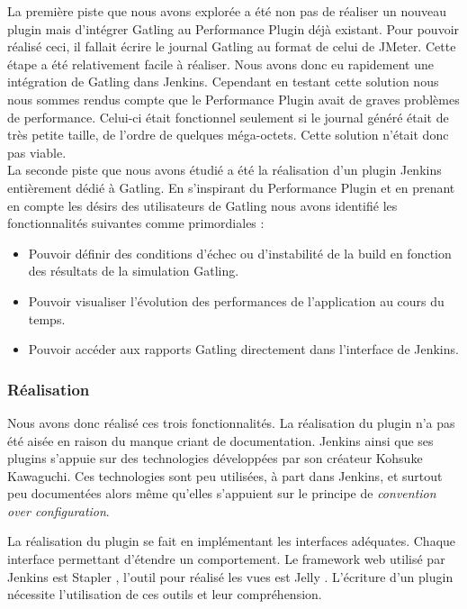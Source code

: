 La première piste que nous avons explorée a été non pas de réaliser un nouveau plugin mais d'intégrer Gatling au Performance Plugin déjà existant. Pour pouvoir réalisé ceci, il fallait écrire le journal Gatling au format de celui de JMeter. Cette étape a été relativement facile à réaliser. Nous avons donc eu rapidement une intégration de Gatling dans Jenkins. Cependant en testant cette solution nous nous sommes rendus compte que le Performance Plugin avait de graves problèmes de performance. Celui-ci était fonctionnel seulement si le journal généré était de très petite taille, de l'ordre de quelques méga-octets. Cette solution n'était donc pas viable.\\

La seconde piste que nous avons étudié a été la réalisation d'un plugin Jenkins entièrement dédié à Gatling.
En s'inspirant du Performance Plugin et en prenant en compte les désirs des utilisateurs de Gatling nous avons identifié les fonctionnalités suivantes comme primordiales :

\begin{itemize}
	\item Pouvoir définir des conditions d'échec ou d'instabilité de la build en fonction  des résultats de la simulation Gatling.
	\item Pouvoir visualiser l'évolution des performances de l'application au cours du temps.
	\item Pouvoir accéder aux rapports Gatling directement dans l'interface de Jenkins.
\end{itemize}

\subsubsection{Réalisation}

Nous avons donc réalisé ces trois fonctionnalités. La réalisation du plugin n'a pas été aisée en raison du manque criant de documentation. Jenkins ainsi que ses plugins s'appuie sur des technologies développées par son créateur  Kohsuke Kawaguchi. Ces technologies sont peu utilisées, à part dans Jenkins, et surtout peu documentées alors même qu'elles s'appuient sur le principe de \textit{convention over configuration}.

La réalisation du plugin se fait en implémentant les interfaces adéquates. Chaque interface permettant d'étendre un comportement. Le framework web utilisé par Jenkins est Stapler \cite{stapler}, l'outil pour réalisé les vues est Jelly \cite{jelly}. L'écriture d'un plugin nécessite l'utilisation de ces outils et leur compréhension.

